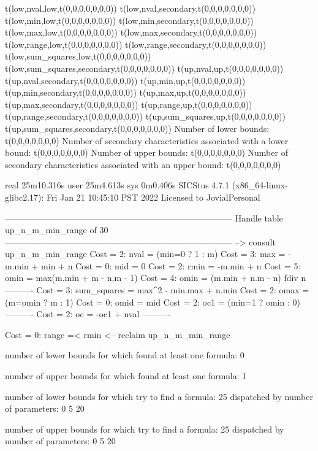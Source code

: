 t(low,nval,low,t(0,0,0,0,0,0,0))
t(low,nval,secondary,t(0,0,0,0,0,0,0))
t(low,min,low,t(0,0,0,0,0,0,0))
t(low,min,secondary,t(0,0,0,0,0,0,0))
t(low,max,low,t(0,0,0,0,0,0,0))
t(low,max,secondary,t(0,0,0,0,0,0,0))
t(low,range,low,t(0,0,0,0,0,0,0))
t(low,range,secondary,t(0,0,0,0,0,0,0))
t(low,sum_squares,low,t(0,0,0,0,0,0,0))
t(low,sum_squares,secondary,t(0,0,0,0,0,0,0))
t(up,nval,up,t(0,0,0,0,0,0,0))
t(up,nval,secondary,t(0,0,0,0,0,0,0))
t(up,min,up,t(0,0,0,0,0,0,0))
t(up,min,secondary,t(0,0,0,0,0,0,0))
t(up,max,up,t(0,0,0,0,0,0,0))
t(up,max,secondary,t(0,0,0,0,0,0,0))
t(up,range,up,t(0,0,0,0,0,0,0))
t(up,range,secondary,t(0,0,0,0,0,0,0))
t(up,sum_squares,up,t(0,0,0,0,0,0,0))
t(up,sum_squares,secondary,t(0,0,0,0,0,0,0))
Number of lower bounds:                                             t(0,0,0,0,0,0,0)
Number of secondary characteristics associated with a lower bound:  t(0,0,0,0,0,0,0)
Number of upper bounds:                                             t(0,0,0,0,0,0,0)
Number of secondary characteristics associated with an upper bound: t(0,0,0,0,0,0,0)

real	25m10.316s
user	25m4.613s
sys	0m0.406s
SICStus 4.7.1 (x86_64-linux-glibc2.17): Fri Jan 21 10:45:10 PST 2022
Licensed to JovialPersonal


--------------------------------------------------------------------------------
Handle table up_n_m_min_range of 30
--------------------------------------------------------------------------------
--> consult up_n_m_min_range
Cost =  2:  nval        = (min=0 ? 1 : m)
Cost =  3:  max         = -m.min + min + n
Cost =  0:  mid         = 0
Cost =  2:  rmin        = -m.min + n
Cost =  5:  omin        = max(m.min + m - n,m - 1)
Cost =  4:  omin        = (m.min + n.m - n) fdiv n
----------
Cost =  3:  sum_squares = max^2 - min.max + n.min
Cost =  2:  omax        = (m=omin ? m : 1)
Cost =  0:  omid        = mid
Cost =  2:  oc1         = (min=1 ? omin : 0)
----------
Cost =  2:  oc          = -oc1 + nval
----------

Cost =  0:  range =< rmin
<-- reclaim up_n_m_min_range

number of lower bounds for which found at least one formula: 0

number of upper bounds for which found at least one formula: 1

number of lower bounds for which try to find a formula: 25
dispatched by number of parameters: 0  5  20

number of upper bounds for which try to find a formula: 25
dispatched by number of parameters: 0  5  20

